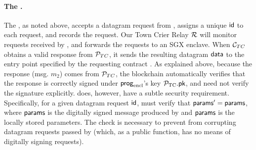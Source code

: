 \paragraph{The \tcontract \tcont.} 
The \tcontract, as noted above, accepts a datagram request from \reqcont, 
assigns a unique ${\sf id}$ to each request, and
records the request.
Our Town Crier Relay $\mathcal{R}$ will monitor
requests received by \tcont, and 
forwards the requests to an SGX enclave.
When ${\cal C}_{TC}$ obtains a valid response
from ${\cal P}_{TC}$,   
it 
sends the resulting datagram ${\sf data}$ to the entry point \dgcallback 
specified by the requesting contract \reqcont. As explained above, because the response (msg. $m_2$) comes from ${\cal P}_{TC}$, the blockchain automatically verifies that the response is correctly signed under ${\sf prog}_{\textrm{encl}}$'s key ${\mathcal{P}}_{\textrm{TC}}.{\sf pk}$, and \tcont need not verify the signature explicitly. \tc does, however, have a subtle security requirement. Specifically,  for a given datagram request ${\sf id}$, \tcont must verify that ${\sf params}' = {\sf params}$, where ${\sf params}$ is the digitally signed message produced by \engine and ${\sf params}$ is the locally stored parameters. The check is necessary to prevent \relay from corrupting datagram requests passed by \tcont (which, as a public function, has no means of digitally signing requests). 

